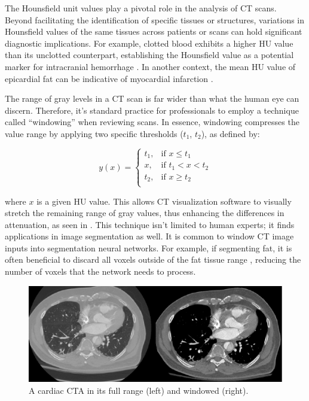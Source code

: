 The Hounsfield unit values play a pivotal role in the analysis of CT scans. Beyond facilitating the identification of specific tissues or structures, variations in Hounsfield values of the same tissues across patients or scans can hold significant diagnostic implications. For example, clotted blood exhibits a higher HU value than its unclotted counterpart, establishing the Hounsfield value as a potential marker for intracranial hemorrhage \cite{kamalianComputedTomographyImaging2016}. In another context, the mean HU value of epicardial fat can be indicative of myocardial infarction \cite{mahabadiCardiacComputedTomographyderived2017}.

The range of gray levels in a CT scan is far wider than what the human eye can discern. Therefore, it's standard practice for professionals to employ a technique called ``windowing'' when reviewing scans. In essence, windowing compresses the value range by applying two specific thresholds ($t_1$, $t_2$), as defined by:

\begin{equation}
y(x) = 
    \begin{cases}
        t_1, & \text{if } x \leq t_1\\
        x, & \text{if } t_1 < x < t_2\\
        	t_2, & \text{if } x \geq t_2\\
    \end{cases}
\end{equation}

where $x$ is a given HU value. This allows CT visualization software to visually stretch the remaining range of gray values, thus enhancing the differences in attenuation, as seen in . This technique isn't limited to human experts; it finds applications in image segmentation as well. It is common to window CT image inputs into segmentation neural networks. For example, if segmenting fat, it is often beneficial to discard all voxels outside of the fat tissue range \cite{bencevicRecentProgressEpicardial2022}, reducing the number of voxels that the network needs to process.

\begin{figure}[h]
 \centering
 \includegraphics[width=\linewidth]{images/windowing-example}
 \caption{A cardiac CTA in its full range (left) and windowed (right). \cite{radlAVTMulticenterAortic2022a}}
 \label{fig:windowing-example}
 \end{figure}

